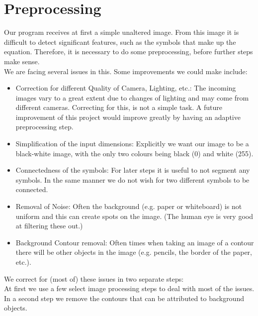 \documentclass[12pt]{article}
\begin{document}
\section{Preprocessing}
	Our program receives at first a simple unaltered image.
	From this image it is difficult to detect significant features, such as the symbols that make up the equation.
	Therefore, it is necessary to do some preprocessing, before further steps make sense.\\
	We are facing several issues in this.
	Some improvements we could make include:\\
	\begin{itemize}
		\item Correction for different Quality of Camera, Lighting, etc.:
		The incoming images vary to a great extent due to changes of lighting and may come from different cameras.
		Correcting for this, is not a simple task.
		A future improvement of this project would improve greatly by having an adaptive preprocessing step.
		\item Simplification of the input dimensions: Explicitly we want our image to be a black-white image, with the only two colours being black (0) and white (255).
		\item Connectedness of the symbols: For later steps it is useful to not segment any symbols. In the same manner we do not wish for two different symbols to be connected.
		\item Removal of Noise: Often the background (e.g. paper or whiteboard) is not uniform and this can create spots on the image. (The human eye is very good at filtering these out.)
		\item Background Contour removal: Often times when taking an image of a contour there will be other objects in the image (e.g. pencils, the border of the paper, etc.).
	\end{itemize}
	We correct for (most of) these issues in two separate steps:\\
	At first we use a few select image processing steps to deal with most of the issues.\\
	In a second step we remove the contours that can be attributed to background objects.
\end{document}
